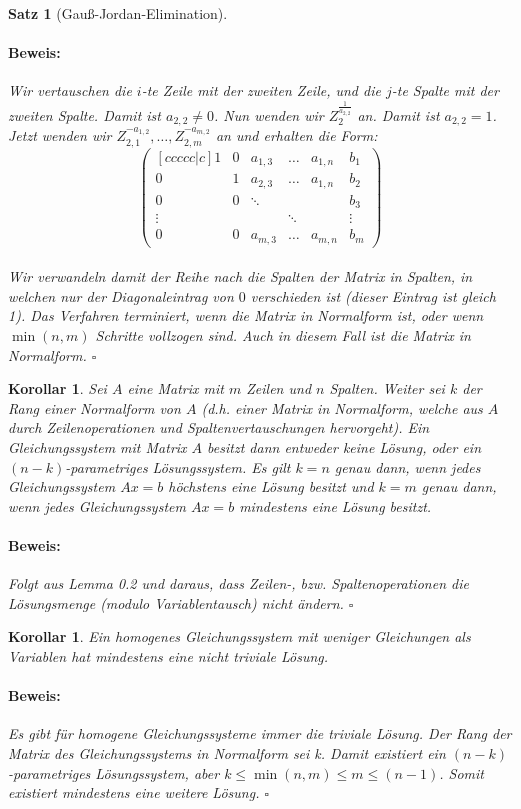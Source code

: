 \documentclass{report}
\theoremstyle{customrem}
\theoremstyle{customdef}
\newtheorem{korrolar}[definition]{Korollar}
\newtheorem{satz}[definition]{Satz}
\renewenvironment{proof}{\vspace{-.75cm}\paragraph{Beweis: }}{\vspace{-.5cm}\hfill$\square$}
\begin{document}
\begin{satz}[Gauß-Jordan-Elimination]
\begin{proof}
			Wir vertauschen die $i$-te Zeile mit der zweiten Zeile, und die $j$-te Spalte mit der zweiten Spalte. Damit ist $a_{2,2} \neq 0$. Nun wenden wir $Z_{2}^{\frac{1}{a_{2,2}}}$ an. Damit ist $a_{2,2} = 1$. Jetzt wenden wir $Z_{2,1}^{-a_{1,2}}, \dots, Z_{2,m}^{-a_{m,2}}$ an und erhalten die Form:
			$$
			\begin{pmatrix}[ccccc|c]
			1 & 0 & a_{1, 3} & \dots & a_{1, n} & b_1\\
			0 & 1 & a_{2, 3} & \dots & a_{1, n} & b_2\\
			0 & 0 & \ddots	 &		 & 			& b_3\\
			\vdots&&		 & \ddots&			& \vdots\\
			0 & 0 & a_{m, 3} & \dots & a_{m, n} & b_m
			\end{pmatrix}
			$$\\
			Wir verwandeln damit der Reihe nach die Spalten der Matrix in Spalten, in welchen nur der Diagonaleintrag von $0$ verschieden ist (dieser Eintrag ist gleich 1).
			Das Verfahren terminiert, wenn die Matrix in Normalform ist, oder wenn $\min(n, m)$ Schritte vollzogen sind. Auch in diesem Fall ist die Matrix in Normalform.
		\end{proof}
	\end{satz}
	\vspace{.2cm}
	\begin{korrolar}
		Sei $A$ eine Matrix mit $m$ Zeilen und $n$ Spalten. Weiter sei $k$ der Rang einer Normalform von $A$ (d.h. einer Matrix in Normalform, welche aus $A$ durch Zeilenoperationen und Spaltenvertauschungen hervorgeht). Ein Gleichungssystem  mit Matrix $A$ besitzt dann entweder keine Lösung, oder ein $(n-k)$-parametriges Lösungssystem. Es gilt $k=n$ genau dann, wenn jedes Gleichungssystem $Ax=b$ höchstens eine Lösung besitzt und $k=m$ genau dann, wenn jedes Gleichungssystem $Ax=b$ mindestens eine Lösung besitzt.\\
		\begin{proof}
			Folgt aus Lemma 0.2 und daraus, dass Zeilen-, bzw. Spaltenoperationen die Lösungsmenge (modulo Variablentausch) nicht ändern.
		\end{proof}
	\end{korrolar}
	\vspace{.2cm}
	\begin{korrolar}
		\label{kor5}
		Ein homogenes Gleichungssystem mit weniger Gleichungen als Variablen hat mindestens eine nicht triviale Lösung.\\
		\begin{proof}
			Es gibt für homogene Gleichungssysteme immer die triviale Lösung. Der Rang der Matrix des Gleichungssystems in Normalform sei k. Damit existiert ein $(n-k)$-parametriges Lösungssystem, aber $k \le \min(n, m) \le m \le (n-1)$. Somit existiert mindestens eine weitere Lösung.
		\end{proof}
	\end{korrolar}
\end{document}
